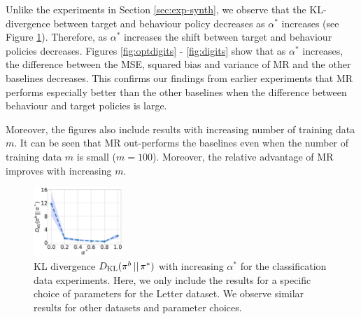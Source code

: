 Unlike the experiments in Section \ref{sec:exp-synth}, we observe that the KL-divergence between target and behaviour policy decreases as $\alpha^\ast$ increases (see Figure \ref{fig:kl_div_multiclass}). 
Therefore, as $\alpha^\ast$ increases the shift between target and behaviour policies decreases.
Figures \ref{fig:optdigits} - \ref{fig:digits} show that as $\alpha^\ast$ increases, 
the difference between the MSE, squared bias and variance of MR and the other baselines decreases. This confirms our findings from earlier experiments that MR performs especially better than the other baselines when the difference between behaviour and target policies is large.

Moreover, the figures also include results with increasing number of training data $m$. It can be seen that MR out-performs the baselines even when the number of training data $m$ is small ($m = 100$). Moreover, the relative advantage of MR improves with increasing $m$.

\begin{figure}[t]
    \centering
    \includegraphics[width=0.3\textwidth]{figures/mr/kl-divergence-multiclass_w_uncertainty.png}
    \caption{KL divergence $D_{\textup{KL}}(\pi^b \, || \, \pi^*)$ with increasing $\alpha^\ast$ for the classification data experiments. Here, we only include the results for a specific choice of parameters for the Letter dataset. We observe similar results for other datasets and parameter choices.}
    \label{fig:kl_div_multiclass}
\end{figure}

